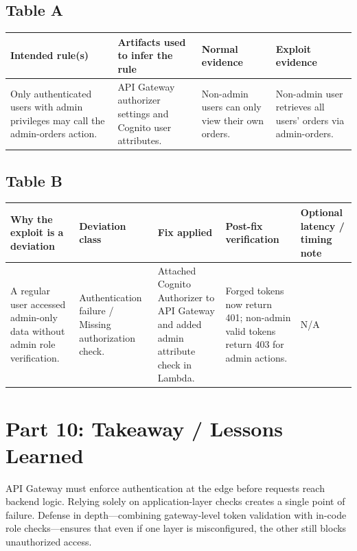 \documentclass[12pt]{report}
\begin{document}
\subsection*{Table A}
\begin{table}[H]
  \small
  \centering
  \begin{tabularx}{\textwidth}{|Y|Y|Y|Y|}
    \hline
    \textbf{Intended rule(s)} & \textbf{Artifacts used to infer the rule} & \textbf{Normal evidence} & \textbf{Exploit evidence} \\
    \hline
    Only authenticated users with admin privileges may call the admin-orders action. &
    API Gateway authorizer settings and Cognito user attributes. &
    Non-admin users can only view their own orders. &
    Non-admin user retrieves all users' orders via admin-orders. \\
    \hline
  \end{tabularx}
\end{table}

\subsection*{Table B}
\begin{table}[H]
  \footnotesize
  \centering
  \begin{tabularx}{\textwidth}{|Y|Y|Y|Y|Y|}
    \hline
    \textbf{Why the exploit is a deviation} & \textbf{Deviation class} & \textbf{Fix applied} & \textbf{Post-fix verification} & \textbf{Optional latency / timing note} \\
    \hline
    A regular user accessed admin-only data without admin role verification. &
    Authentication failure / Missing authorization check. &
    Attached Cognito Authorizer to API Gateway and added admin attribute check in Lambda. &
    Forged tokens now return 401; non-admin valid tokens return 403 for admin actions. &
    N/A \\
    \hline
  \end{tabularx}
\end{table}

\section{Part 10: Takeaway / Lessons Learned}
API Gateway must enforce authentication at the edge before requests reach backend logic. Relying solely on application-layer checks creates a single point of failure. Defense in depth---combining gateway-level token validation with in-code role checks---ensures that even if one layer is misconfigured, the other still blocks unauthorized access.
\end{document}
